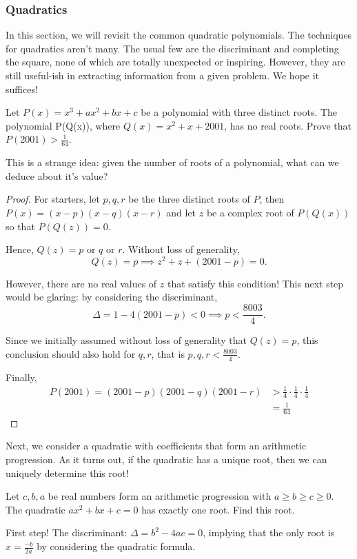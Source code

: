 \documentclass[../main.tex]{subfiles}
\begin{document}
\subsubsection{Quadratics}
In this section, we will revisit the common quadratic polynomials.
The techniques for quadratics aren't many. The usual few are the discriminant and completing the square, none of which are totally unexpected or inspiring. However, they are still useful-ish in extracting information from a given problem. We hope it suffices!
\begin{example}[2010-2011 Mandelbrot]
    Let $P(x)=x^3+ax^2+bx+c$ be a polynomial with three distinct roots. The polynomial P(Q(x)), where $Q(x)=x^2+x+2001$, has no real roots. Prove that $P(2001)>\frac{1}{64}$.
\end{example}
This is a strange idea: given the number of roots of a polynomial, what can we deduce about it's value?

\begin{proof}
    For starters, let $p,q,r$ be the three distinct roots of $P$, then $P(x)=(x-p)(x-q)(x-r)$ and let $z$ be a complex root of $P(Q(x))$ so that $P(Q(z))=0$. 

Hence, $Q(z)=\text{$p$ or $q$ or $r$}$. Without loss of generality, $$Q(z)=p \implies z^2+z+(2001-p)=0.$$

However, there are no real values of $z$ that satisfy this condition! This next step would be glaring: by considering the discriminant,
$$\Delta=1-4(2001-p) < 0 \implies p < \frac{8003}{4}.$$

Since we initially assumed without loss of generality that $Q(z)=p$, this conclusion should also hold for $q, r$, that is $p,q,r < \frac{8003}{4}$.

Finally, \begin{align*}
    P(2001)=(2001-p)(2001-q)(2001-r) &> \frac{1}{4}\cdot\frac{1}{4}\cdot\frac{1}{4} \\
    &=\frac{1}{64}
\end{align*}
\end{proof}
Next, we consider a quadratic with coefficients that form an arithmetic progression. As it turns out, if the quadratic has a unique root, then we can uniquely determine this root!
\begin{example}[2013 AMC 10B P19]
    Let $c,b,a$ be real numbers form an arithmetic progression with $a\geq b\geq c\geq 0$. The quadratic $ax^2+bx+c=0$ has exactly one root. Find this root.
\end{example}
First step! The discriminant: $\Delta=b^2-4ac=0$, implying that the only root is $x=\frac{-b}{2a}$ by considering the quadratic formula.
\end{document}
